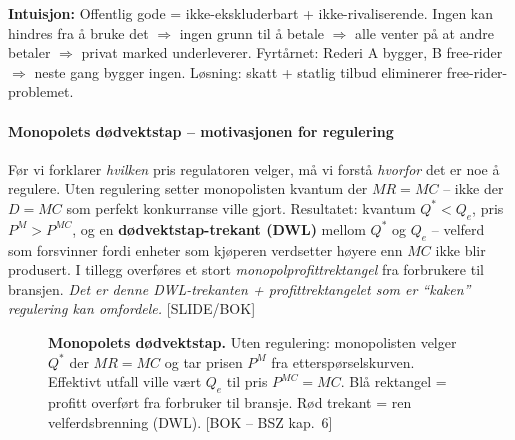\begin{tcolorbox}[colback=blue!4, colframe=blue!50!black, boxrule=0.4pt, arc=2pt, left=6pt, right=6pt, top=4pt, bottom=4pt]
\textbf{Intuisjon:} Offentlig gode = ikke-ekskluderbart + ikke-rivaliserende. Ingen kan hindres fra å bruke det $\Rightarrow$ ingen grunn til å betale $\Rightarrow$ alle venter på at andre betaler $\Rightarrow$ privat marked underleverer. Fyrtårnet: Rederi A bygger, B free-rider $\Rightarrow$ neste gang bygger ingen. Løsning: skatt + statlig tilbud eliminerer free-rider-problemet.
\end{tcolorbox}

\paragraph{Monopolets dødvektstap -- motivasjonen for regulering\quad\SOne}
Før vi forklarer \emph{hvilken} pris regulatoren velger, må vi forstå \emph{hvorfor} det er noe å regulere. Uten regulering setter monopolisten kvantum der $MR=MC$ -- ikke der $D=MC$ som perfekt konkurranse ville gjort. Resultatet: kvantum $Q^*<Q_e$, pris $P^M>P^{MC}$, og en \textbf{dødvektstap-trekant (DWL)} mellom $Q^*$ og $Q_e$ -- velferd som forsvinner fordi enheter som kjøperen verdsetter høyere enn $MC$ ikke blir produsert. I tillegg overføres et stort \emph{monopolprofittrektangel} fra forbrukere til bransjen. \emph{Det er denne DWL-trekanten + profittrektangelet som er ``kaken'' regulering kan omfordele.} [SLIDE/BOK]

\begin{figure}[H]
\centering
{}
\caption{\textbf{Monopolets dødvektstap.} Uten regulering: monopolisten velger $Q^*$ der $MR=MC$ og tar prisen $P^M$ fra etterspørselskurven. Effektivt utfall ville vært $Q_e$ til pris $P^{MC}=MC$. Blå rektangel = profitt overført fra forbruker til bransje. Rød trekant = ren velferdsbrenning (DWL). [BOK -- BSZ kap.\ 6]}
\end{figure}

